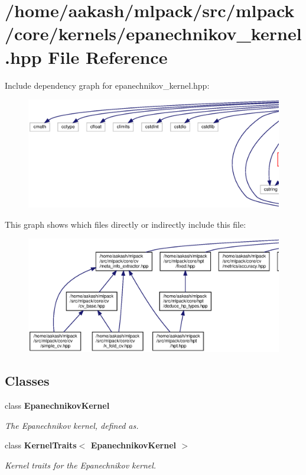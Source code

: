 \section{/home/aakash/mlpack/src/mlpack/core/kernels/epanechnikov\+\_\+kernel.hpp File Reference}
\label{epanechnikov__kernel_8hpp}
Include dependency graph for epanechnikov\+\_\+kernel.\+hpp\+:
\nopagebreak
\begin{figure}[H]
\begin{center}
\leavevmode
\includegraphics[width=350pt]{epanechnikov__kernel_8hpp__incl}
\end{center}
\end{figure}
This graph shows which files directly or indirectly include this file\+:
\nopagebreak
\begin{figure}[H]
\begin{center}
\leavevmode
\includegraphics[width=350pt]{epanechnikov__kernel_8hpp__dep__incl}
\end{center}
\end{figure}
\subsection*{Classes}
\begin{DoxyCompactItemize}
\item 
class \textbf{ Epanechnikov\+Kernel}
\begin{DoxyCompactList}\small\item\em The Epanechnikov kernel, defined as. \end{DoxyCompactList}\item 
class \textbf{ Kernel\+Traits$<$ Epanechnikov\+Kernel $>$}
\begin{DoxyCompactList}\small\item\em Kernel traits for the Epanechnikov kernel. \end{DoxyCompactList}\end{DoxyCompactItemize}
